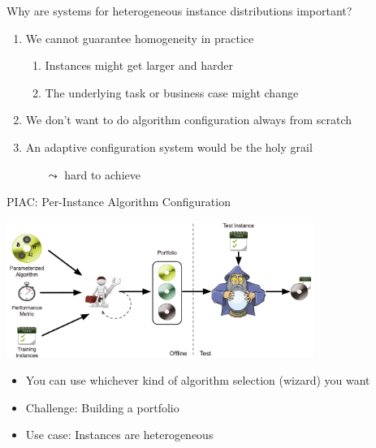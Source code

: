 \begin{frame}[c]{Why are systems for heterogeneous instance distributions important?}

\begin{enumerate}
	\item We cannot guarantee homogeneity in practice
	\begin{enumerate}
		\item Instances might get larger and harder
		\item The underlying task or business case might change
	\end{enumerate}
	\medskip
	\pause
	\item We don't want to do algorithm configuration always from scratch
	\medskip
	\pause
	\item An adaptive configuration system would be the holy grail 
	\begin{itemize}
		\item[$\leadsto$] hard to achieve
 	\end{itemize}
\end{enumerate}


\end{frame}
\begin{frame}[c]{PIAC: Per-Instance Algorithm Configuration}

\centering
\includegraphics[width=0.75\textwidth]{images/piac_full_comic}

\pause
\bigskip

\begin{itemize}
	\item You can use whichever kind of algorithm selection (wizard) you want
	\item \alert{Challenge:} Building a portfolio
	\item \alert{Use case:} Instances are heterogeneous
\end{itemize}

\end{frame}

